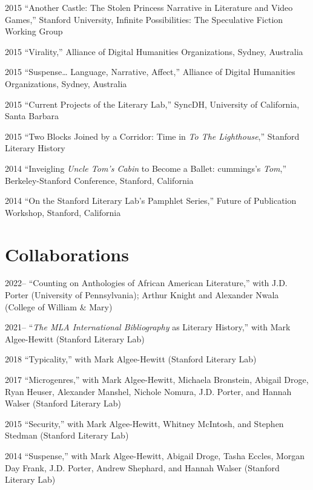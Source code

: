 \documentclass[12pt,letterpaper]{report}
\begin{document}
\begin{tablist}
	\item[2015] \tab{}\enquote{Another Castle: The Stolen Princess Narrative in Literature and Video Games,} Stanford University, Infinite Possibilities: The Speculative Fiction Working Group
	\item[2015] \tab{}\enquote{Virality,} Alliance of Digital Humanities Organizations, Sydney, Australia
	\item[2015] \tab{}\enquote{Suspense… Language, Narrative, Affect,} Alliance of Digital Humanities Organizations, Sydney, Australia
	\item[2015] \tab{}\enquote{Current Projects of the Literary Lab,} SyncDH, University of California, Santa Barbara
	\item[2015] \tab{}\enquote{Two Blocks Joined by a Corridor: Time in \emph{To The Lighthouse},} Stanford Literary History
	\item[2014] \tab{}\enquote{Inveigling \emph{Uncle Tom's Cabin} to Become a Ballet: cummings's \emph{Tom},} Berkeley-Stanford Conference, Stanford, California
	\item[2014] \tab{}\enquote{On the Stanford Literary Lab's Pamphlet Series,} Future of Publication Workshop, Stanford, California
\end{tablist}


\section*{Collaborations}

\begin{tablist}
	\item[2022--] \tab{}\enquote{Counting on Anthologies of African American Literature,} with J.D. Porter (University of Pennsylvania); Arthur Knight and Alexander Nwala (College of William \& Mary)
	\item[2021--] \tab{}\enquote{\emph{The MLA International Bibliography} as Literary History,} with Mark Algee-Hewitt (Stanford Literary Lab)
	\item[2018] \tab{}\enquote{Typicality,} with Mark Algee-Hewitt (Stanford Literary Lab)
	\item[2017] \tab{}\enquote{Microgenres,} with Mark Algee-Hewitt, Michaela Bronstein, Abigail Droge, Ryan Heuser, Alexander Manshel, Nichole Nomura, J.D. Porter, and Hannah Walser (Stanford Literary Lab)
	\item[2015] \tab{}\enquote{Security,} with Mark Algee-Hewitt, Whitney McIntosh, and Stephen Stedman (Stanford Literary Lab)
	\item[2014] \tab{}\enquote{Suspense,} with Mark Algee-Hewitt, Abigail Droge, Tasha Eccles, Morgan Day Frank, J.D. Porter, Andrew Shephard, and Hannah Walser (Stanford Literary Lab)
\end{tablist}
\end{document}
